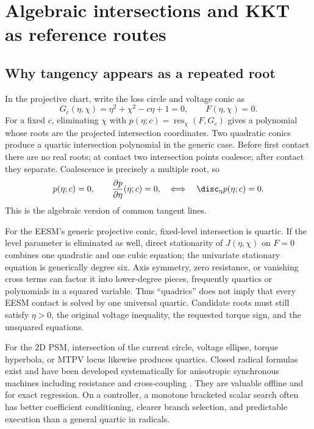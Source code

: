\section{Algebraic intersections and KKT as reference routes}
\label{sec:algebraic}

\subsection{Why tangency appears as a repeated root}

In the projective chart, write the loss circle and voltage conic as
\begin{equation}
 G_c(\eta,\chi)=\eta^2+\chi^2-c\eta+1=0,
 \qquad F(\eta,\chi)=0.
\end{equation}
For a fixed \(c\), eliminating \(\chi\) with
\(p(\eta;c)=\operatorname{res}_\chi(F,G_c)\) gives a polynomial whose roots
are the projected intersection coordinates. Two quadratic conics produce a
quartic intersection polynomial in the generic case. Before first contact
there are no real roots; at contact two intersection points coalesce; after
contact they separate. Coalescence is precisely a multiple root, so
\begin{equation}
 p(\eta;c)=0,\qquad \frac{\partial p}{\partial\eta}(\eta;c)=0,
 \quad\Longleftrightarrow\quad \disc_\eta p(\eta;c)=0.
 \label{eq:discriminant-contact}
\end{equation}
This is the algebraic version of common tangent lines.

For the EESM's generic projective conic, fixed-level intersection is quartic.
If the level parameter is eliminated as well, direct stationarity of
\(J(\eta,\chi)\) on \(F=0\) combines one quadratic and one cubic equation;
the univariate stationary equation is generically degree six. Axis symmetry,
zero resistance, or vanishing cross terms can factor it into lower-degree
pieces, frequently quartics or polynomials in a squared variable. Thus
``quadrics'' does not imply that every EESM contact is solved by one universal
quartic. Candidate roots must still satisfy \(\eta>0\), the original voltage
inequality, the requested torque sign, and the unsquared equations.

For the 2D PSM, intersection of the current circle, voltage ellipse, torque
hyperbola, or MTPV locus likewise produces quartics. Closed radical formulas
exist and have been developed systematically for anisotropic synchronous
machines including resistance and cross-coupling \cite{eldeeb2018,eldeeb2016}.
They are valuable offline and for exact regression. On a controller, a
monotone bracketed scalar search often has better coefficient conditioning,
clearer branch selection, and predictable execution than a general quartic in
radicals.

